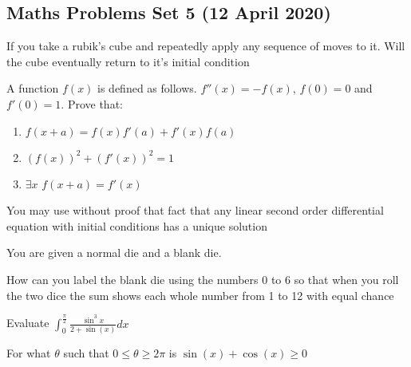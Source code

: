 \documentclass{article}
\begin{document}
\begin{center}
        \section*{Maths Problems Set 5 (12 April 2020)}
\end{center}

\begin{enumerate}
    
\end{enumerate}

    \item
    If you take a rubik's cube and repeatedly apply any sequence of moves to it. Will the cube eventually return to it's initial condition

    \item

    \item

    \item

	\item
	A function $f(x)$ is defined as follows. $f''(x) = -f(x)$, $f(0) = 0$ and $f'(0) = 1$. Prove that:
	\begin{enumerate}
	    \item $f(x + a) = f(x)f'(a) + f'(x)f(a)$
	    \item $(f(x))^2 + (f'(x))^2 = 1$
	    \item $\exists x$ $f(x+a) = f'(x)$
	\end{enumerate}
	You may use without proof that fact that any linear second order differential equation with initial conditions has a unique solution

	\item
	You are given a normal die and a blank die.

	How can you label the blank die using the numbers 0 to 6 so that when you roll the two dice the sum shows each whole number from 1 to 12 with equal chance

	\item

	\item
	Evaluate
	$\int_{0}^{\frac{\pi}{2}} \frac{\sin^3{x}}{2 + \sin(x)} dx$

	\item
	For what $\theta$ such that $0 \leq \theta \geq 2\pi$ is $\sin(x) + \cos(x) \geq 0$
\end{document}
